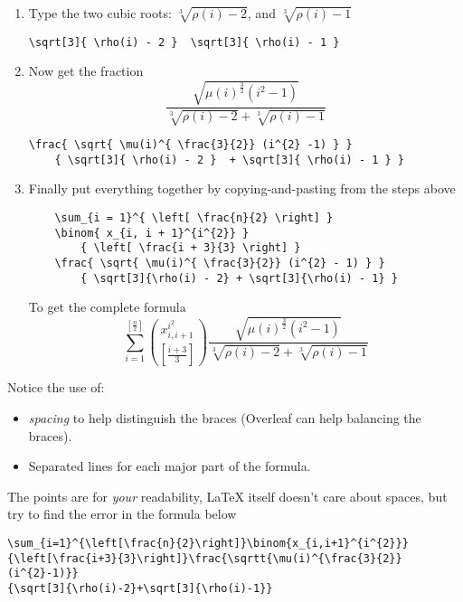 \begin{enumerate}
\begin{verbatim}
    \end{verbatim}
    Then add the square root $\sqrt{ \mu(i)^{ \frac{3}{2} } (i^{2} - 1) }$
    \begin{verbatim}
\sqrt{ \mu(i)^{ \frac{3}{2} } (i^{2} - 1) }    
    \end{verbatim}
    \item Type the two cubic roots: $\sqrt[3]{ \rho(i) - 2 }$, and $\sqrt[3]{ \rho(i) - 1 }$
    \begin{verbatim}
\sqrt[3]{ \rho(i) - 2 }  \sqrt[3]{ \rho(i) - 1 }
    \end{verbatim}
    \item Now get the fraction
    \[
    \frac{ \sqrt{ \mu(i)^{ \frac{3}{2}} (i^{2} -1) } }
        { \sqrt[3]{ \rho(i) - 2 }  + \sqrt[3]{ \rho(i) - 1 } }
    \]
    \begin{verbatim}
\frac{ \sqrt{ \mu(i)^{ \frac{3}{2}} (i^{2} -1) } }
    { \sqrt[3]{ \rho(i) - 2 }  + \sqrt[3]{ \rho(i) - 1 } }
    \end{verbatim}
    \item Finally put everything together by copying-and-pasting from the steps above
    \begin{verbatim}
    \sum_{i = 1}^{ \left[ \frac{n}{2} \right] }
    \binom{ x_{i, i + 1}^{i^{2}} }
        { \left[ \frac{i + 3}{3} \right] }
    \frac{ \sqrt{ \mu(i)^{ \frac{3}{2}} (i^{2} - 1) } }
        { \sqrt[3]{\rho(i) - 2} + \sqrt[3]{\rho(i) - 1} }
    \end{verbatim}
    To get the complete formula
    \[
    \sum_{i = 1}^{ \left[ \frac{n}{2} \right] }
    \binom{ x_{i, i + 1}^{i^{2}} }
        { \left[ \frac{i + 3}{3} \right] }
    \frac{ \sqrt{ \mu(i)^{ \frac{3}{2}} (i^{2} - 1) } }
        { \sqrt[3]{\rho(i) - 2} + \sqrt[3]{\rho(i) - 1} }
    \]
\end{enumerate}

Notice the use of:
\begin{itemize}
    \item \emph{spacing} to help distinguish the braces (Overleaf can help balancing the braces).
    \item Separated lines for each major part of the formula. 
\end{itemize}

The points are for \emph{your} readability, \LaTeX{} itself doesn't care about spaces, but try to find the error in the formula below

\begin{verbatim}
\sum_{i=1}^{\left[\frac{n}{2}\right]}\binom{x_{i,i+1}^{i^{2}}}
{\left[\frac{i+3}{3}\right]}\frac{\sqrtt{\mu(i)^{\frac{3}{2}}(i^{2}-1)}}
{\sqrt[3]{\rho(i)-2}+\sqrt[3]{\rho(i)-1}}
\end{verbatim}
